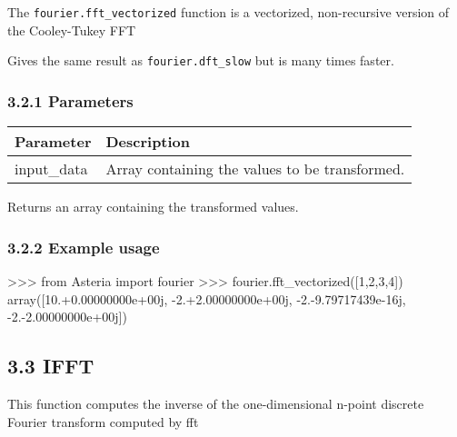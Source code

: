 \documentclass[]{article}
\newenvironment{Shaded}{}{}
\newcommand{\DecValTok}[1]{\textcolor[rgb]{0.25,0.63,0.44}{#1}}
\newcommand{\FloatTok}[1]{\textcolor[rgb]{0.25,0.63,0.44}{#1}}
\newcommand{\ImportTok}[1]{#1}
\newcommand{\OperatorTok}[1]{\textcolor[rgb]{0.40,0.40,0.40}{#1}}
\newcommand{\NormalTok}[1]{#1}
\begin{document}
The \texttt{fourier.fft\_vectorized} function is a vectorized,
non-recursive version of the Cooley-Tukey FFT

Gives the same result as \texttt{fourier.dft\_slow} but is many times
faster.

\subsubsection{3.2.1 Parameters}\label{parameters-1}

\begin{longtable}[]{@{}ll@{}}
\toprule
Parameter & Description\tabularnewline
\midrule
\endhead
input\_data & Array containing the values to be
transformed.\tabularnewline
\bottomrule
\end{longtable}

Returns an array containing the transformed values.

\subsubsection{3.2.2 Example usage}\label{example-usage-1}

\begin{Shaded}
\begin{Highlighting}[]
\OperatorTok{>>>} \ImportTok{from}\NormalTok{ Asteria }\ImportTok{import}\NormalTok{ fourier}
\OperatorTok{>>>}\NormalTok{ fourier.fft_vectorized([}\DecValTok{1}\NormalTok{,}\DecValTok{2}\NormalTok{,}\DecValTok{3}\NormalTok{,}\DecValTok{4}\NormalTok{])}
\NormalTok{array([}\DecValTok{10}\NormalTok{.}\OperatorTok{+}\FloatTok{0.}\NormalTok{00000000e}\OperatorTok{+}\NormalTok{00j, }\OperatorTok{-}\DecValTok{2}\NormalTok{.}\OperatorTok{+}\FloatTok{2.}\NormalTok{00000000e}\OperatorTok{+}\NormalTok{00j, }\OperatorTok{-}\DecValTok{2}\NormalTok{.}\OperatorTok{-}\FloatTok{9.}\NormalTok{79717439e}\OperatorTok{-}\NormalTok{16j, }\OperatorTok{-}\DecValTok{2}\NormalTok{.}\OperatorTok{-}\FloatTok{2.}\NormalTok{00000000e}\OperatorTok{+}\NormalTok{00j])}
\end{Highlighting}
\end{Shaded}

\subsection{3.3 IFFT}\label{ifft}

This function computes the inverse of the one-dimensional n-point
discrete Fourier transform computed by fft
\end{document}
